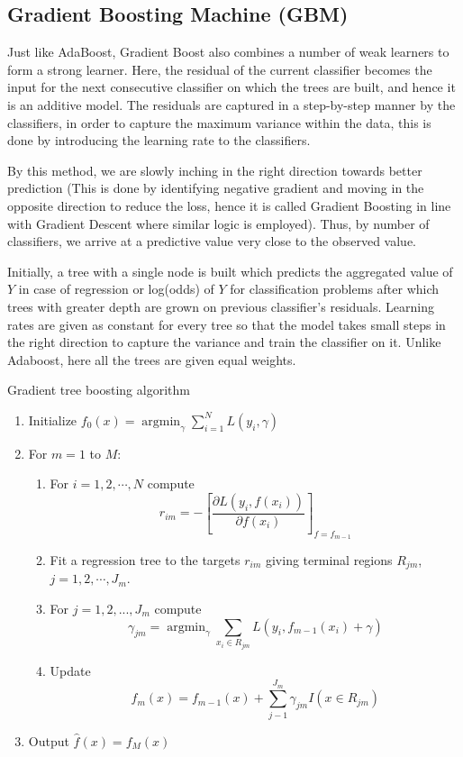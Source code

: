 \documentclass{article}
\DeclareMathOperator*{\argmin}{argmin}
\begin{document}
\subsection{Gradient Boosting Machine (GBM)}

Just like AdaBoost, Gradient Boost also combines a number of weak learners to form a strong learner. Here, the residual of the current classifier becomes the input for the next consecutive classifier on which the trees are built, and hence it is an additive model. The residuals are captured in a step-by-step manner by the classifiers, in order to capture the maximum variance within the data, this is done by introducing the learning rate to the classifiers.

By this method, we are slowly inching in the right direction towards better prediction (This is done by identifying negative gradient and moving in the opposite direction to reduce the loss, hence it is called Gradient Boosting in line with Gradient Descent where similar logic is employed). Thus, by number of classifiers, we arrive at a predictive value very close to the observed value.

Initially, a tree with a single node is built which predicts the aggregated value of $Y$ in case of regression or log(odds) of $Y$ for classification problems after which trees with greater depth are grown on previous classifier's residuals. Learning rates are given as constant for every tree so that the model takes small steps in the right direction to capture the variance and train the classifier on it. Unlike Adaboost, here all the trees are given equal weights.

\begin{algorithm}[h]
\caption{Gradient tree boosting algorithm}
\begin{enumerate}
\item Initialize $f_0(x) = \argmin_\gamma \sum_{i=1}^{N} L(y_i, \gamma)$
\item For $m=1$ to $M$:
	\begin{enumerate}
		\item For $i = 1,2,\cdots,N$ compute
		\[ r_{im} = - \left[ \frac{\partial L(y_i, f(x_i))}{\partial f(x_i)} \right]_{f=f_{m-1}}\]
		\item Fit a regression tree to the targets $r_{im}$ giving terminal regions $R_{jm}$, $j = 1,2,\cdots,J_m$.
		\item For $j = 1,2,...,J_m$ compute
		\[ \gamma_{jm} = \argmin_{\gamma} \sum_{x_i \in R_{jm}}  L(y_i, f_{m-1}(x_i) + \gamma) \]
		\item Update 
		\[ f_m(x) = f_{m-1}(x) + \sum_{j-1}^{J_m} \gamma_{jm} I(x \in R_{jm})\]
	\end{enumerate}
\item Output $\hat{f}(x) = f_M(x)$
\end{enumerate}
\end{algorithm}
\end{document}
